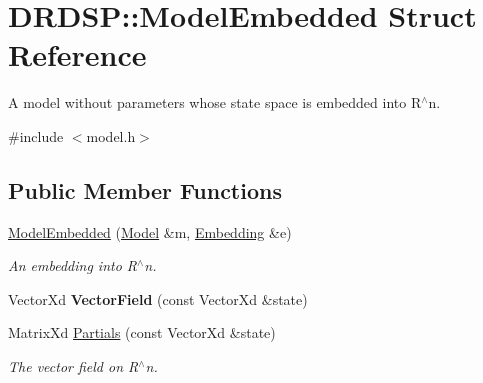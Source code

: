 \hypertarget{struct_d_r_d_s_p_1_1_model_embedded}{\section{D\-R\-D\-S\-P\-:\-:Model\-Embedded Struct Reference}
\label{struct_d_r_d_s_p_1_1_model_embedded}
}


A model without parameters whose state space is embedded into R$^\wedge$n.  




{\ttfamily \#include $<$model.\-h$>$}

\subsection*{Public Member Functions}
\begin{DoxyCompactItemize}
\item 
\hypertarget{struct_d_r_d_s_p_1_1_model_embedded_aac8110fc1d52b006311cc1ca9377a8d4}{\hyperlink{struct_d_r_d_s_p_1_1_model_embedded_aac8110fc1d52b006311cc1ca9377a8d4}{Model\-Embedded} (\hyperlink{struct_d_r_d_s_p_1_1_model}{Model} \&m, \hyperlink{struct_d_r_d_s_p_1_1_embedding}{Embedding} \&e)}\label{struct_d_r_d_s_p_1_1_model_embedded_aac8110fc1d52b006311cc1ca9377a8d4}

\begin{DoxyCompactList}\small\item\em An embedding into R$^\wedge$n. \end{DoxyCompactList}\item 
\hypertarget{struct_d_r_d_s_p_1_1_model_embedded_a4f33e3c6473e997ae92c75771aa918fd}{Vector\-Xd {\bfseries Vector\-Field} (const Vector\-Xd \&state)}\label{struct_d_r_d_s_p_1_1_model_embedded_a4f33e3c6473e997ae92c75771aa918fd}

\item 
\hypertarget{struct_d_r_d_s_p_1_1_model_embedded_a6aaa71ce7c8a2b11f86e7950498249c0}{Matrix\-Xd \hyperlink{struct_d_r_d_s_p_1_1_model_embedded_a6aaa71ce7c8a2b11f86e7950498249c0}{Partials} (const Vector\-Xd \&state)}\label{struct_d_r_d_s_p_1_1_model_embedded_a6aaa71ce7c8a2b11f86e7950498249c0}

\begin{DoxyCompactList}\small\item\em The vector field on R$^\wedge$n. \end{DoxyCompactList}\end{DoxyCompactItemize}

